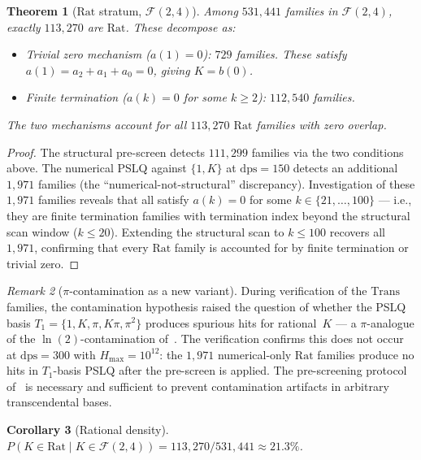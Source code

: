 \documentclass[12pt, reqno]{amsart}
\newtheorem{theorem}{Theorem}[section]
\newtheorem{corollary}[theorem]{Corollary}
\theoremstyle{definition}
\theoremstyle{remark}
\newtheorem{remark}[theorem]{Remark}
\newcommand{\Rat}{\mathrm{Rat}}
\newcommand{\Trans}{\mathrm{Trans}}
\begin{document}
\begin{theorem}[$\Rat$ stratum, $\mathcal{F}(2,4)$]\label{thm:rat}
Among $531{,}441$ families in $\mathcal{F}(2,4)$,
exactly $113{,}270$ are $\Rat$. These decompose as:
\begin{itemize}
\item \emph{Trivial zero mechanism} ($a(1)=0$): $729$ families.
  These satisfy $a(1) = a_2 + a_1 + a_0 = 0$, giving $K = b(0)$.
\item \emph{Finite termination} ($a(k)=0$ for some $k\ge 2$): $112{,}540$ families.
\end{itemize}
The two mechanisms account for all $113{,}270$ $\Rat$ families with zero overlap.
\end{theorem}

\begin{proof}
The structural pre-screen detects $111{,}299$ families via the
two conditions above. The numerical PSLQ against $\{1, K\}$ at $\mathrm{dps}=150$
detects an additional $1{,}971$ families (the ``numerical-not-structural''
discrepancy). Investigation of these $1{,}971$ families reveals that all
satisfy $a(k) = 0$ for some $k \in \{21,\dots,100\}$ --- i.e., they are finite
termination families with termination index beyond the structural
scan window ($k \le 20$). Extending the structural scan to $k \le 100$
recovers all $1{,}971$, confirming that every $\Rat$ family is accounted for
by finite termination or trivial zero.
\end{proof}

\begin{remark}[$\pi$-contamination as a new variant]\label{rem:picontam}
During verification of
the $\Trans$ families, the contamination hypothesis raised the question
of whether the PSLQ basis $T_1 = \{1, K, \pi, K\pi, \pi^2\}$ produces spurious
hits for rational~$K$ --- a $\pi$-analogue of the $\ln(2)$-contamination of~\cite{contamination}.
The verification confirms this does not occur at $\mathrm{dps}=300$ with $H_{\max}=10^{12}$:
the $1{,}971$ numerical-only $\Rat$ families produce no hits in $T_1$-basis PSLQ
after the pre-screen is applied. The pre-screening protocol of~\cite{contamination} is
necessary and sufficient to prevent contamination artifacts in arbitrary
transcendental bases.
\end{remark}

\begin{corollary}[Rational density]\label{cor:ratdensity}
$P(K \in \Rat \mid K \in \mathcal{F}(2,4)) = 113{,}270/531{,}441 \approx 21.3\%$.
\end{corollary}
\end{document}
